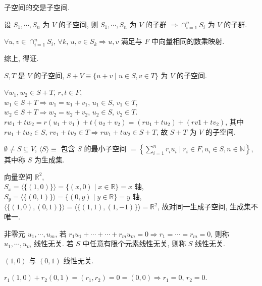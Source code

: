 \documentclass{note}
\begin{document}
子空间的交是子空间.
\begin{pf}
    设 $S_1,\cdots,S_n$ 为 $V$ 的子空间, 则 $S_1,\cdots,S_n$ 为 $V$ 的子群 $\Longrightarrow\cap_{i=1}^nS_i$ 为 $V$ 的子群.

    $\forall u,v\in\cap_{i=1}^nS_i$, $\forall k$, $u,v\in S_k\Longrightarrow u,v$ 满足与 $F$ 中向量相同的数乘映射.

    综上, 得证.
\end{pf}

$S,T$ 是 $V$ 的子空间, $S+V\equiv\{u+v\mid u\in S,v\in T\}$ 为 $V$ 的子空间.
\begin{pf}
    $\forall w_1,w_2\in S+T$, $r,t\in F$,\\
    $w_1\in S+T\Longrightarrow w_1=u_1+v_1$, $u_1\in S$, $v_1\in T$,\\
    $w_2\in S+T\Longrightarrow w_2=u_2+v_2$, $u_2\in S$, $v_2\in T$.\\
    $rw_1+tw_2=r(u_1+v_1)+t(u_2+v_2)=(ru_1+tu_2)+(rv1+tv_2)$, 其中 $ru_1+tu_2\in S$, $rv_1+tv_2\in T\Longrightarrow rw_1+tw_2\in S+T$, 故 $S+T$ 为 $V$ 的子空间.
\end{pf}

\begin{df}[生成子空间]
    $\emptyset\neq S\subseteq V$, $\langle S\rangle\equiv$ 包含 $S$ 的最小子空间 $=\left\{\sum_{i=1}^nr_iu_i\mid r_i\in F,u_i\in S,n\in\mathbb{N}\right\}$, 其中称 $S$ 为生成集.
\end{df}

\begin{eg}
    向量空间 $\mathbb{R}^2$,\\
    $S_x=\langle\{(1,0)\}\rangle=\{(x,0)\mid x\in\mathbb{R}\}=x$ 轴,\\
    $S_y=\langle\{(0,1)\}\rangle=\{(0,y)\mid y\in\mathbb{R}\}=y$ 轴,\\
    $\langle\{(1,0),(0,1)\}\rangle=\langle\{(1,1),(1,-1)\}\rangle=\mathbb{R}^2$, 故对同一生成子空间, 生成集不唯一.
\end{eg}

\begin{df}[线性无关]
    非零元 $u_1,\cdots,u_m$, 若 $r_1u_1+\cdots+\cdots+r_mu_m=0\Longrightarrow r_1=\cdots=r_m=0$, 则称 $u_1,\cdots,u_m$ 线性无关. 若 $S$ 中任意有限个元素线性无关, 则称 $S$ 线性无关.
\end{df}

\begin{eg}
    $(1,0)$ 与 $(0,1)$ 线性无关.
\end{eg}
\begin{pf}
    $r_1(1,0)+r_2(0,1)=(r_1,r_2)=0=(0,0)\Longrightarrow r_1=0$, $r_2=0$.
\end{pf}
\end{document}
